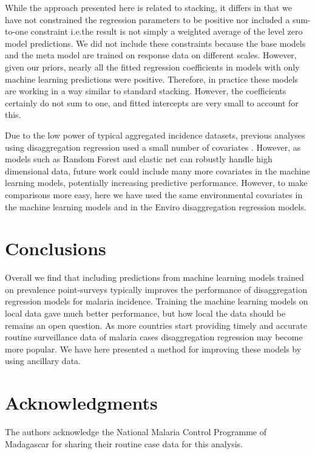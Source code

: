 \documentclass[11pt]{article}
\begin{document}
While the approach presented here is related to stacking, it differs in that we have not constrained the regression parameters to be positive nor included a sum-to-one constraint i.e.\thinspace the result is not simply a weighted average of the level zero model predictions.
We did not include these constraints because the base models and the meta model are trained on response data on different scales.
However, given our priors, nearly all the fitted regression coefficients in models with only machine learning predictions were positive.
Therefore, in practice these models are working in a way similar to standard stacking.
However, the coefficients certainly do not sum to one, and fitted intercepts are very small to account for this.


Due to the low power of typical aggregated incidence datasets, previous analyses using disaggregation regression used a small number of covariates \citep{sturrock2014fine}.
However, as models such as Random Forest and elastic net can robustly handle high dimensional data, future work could include many more covariates in the machine learning models, potentially increasing predictive performance.
However, to make comparisons more easy, here we have used the same environmental covariates in the machine learning models and in the Enviro disaggregation regression models.



\section{Conclusions}

Overall we find that including predictions from machine learning models trained on prevalence point-surveys typically improves the performance of disaggregation regression models for malaria incidence.
Training the machine learning models on local data gave much better performance, but how local the data should be remains an open question.
As more countries start providing timely and accurate routine surveillance data of malaria cases disaggregation regression may become more popular.
We have here presented a method for improving these models by using ancillary data.



\section*{Acknowledgments}
The authors acknowledge the National Malaria Control Programme of Madagascar for sharing their routine case data for this analysis.

 

\end{document}
